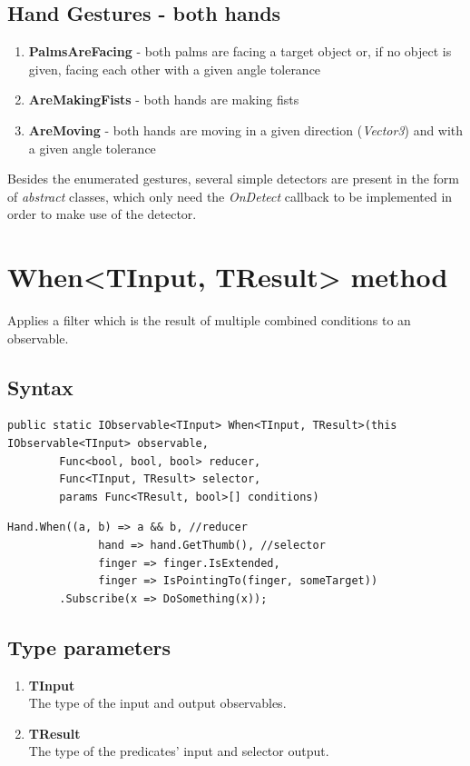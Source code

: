 \documentclass[12pt,a4paper,twoside]{report}
\begin{document}
\subsection{Hand Gestures - both hands}
\begin{enumerate}
  \item \textbf{PalmsAreFacing} - both palms are facing a target object or, if no object is given, facing each other with a given angle tolerance
  \item \textbf{AreMakingFists} - both hands are making fists
  \item \textbf{AreMoving} - both hands are moving in a given direction (\textit{Vector3}) and with a given angle tolerance
\end{enumerate}

Besides the enumerated gestures, several simple detectors are present in the form of \textit{abstract} classes, which only need the \textit{OnDetect} callback to be implemented in order to make use of the detector.

\section{When<TInput, TResult> method}

Applies a filter which is the result of multiple combined conditions to an observable.

\subsection{Syntax}

\begin{lstlisting}[caption=Declaration]
    public static IObservable<TInput> When<TInput, TResult>(this IObservable<TInput> observable,
        Func<bool, bool, bool> reducer,
        Func<TInput, TResult> selector,
        params Func<TResult, bool>[] conditions) 
\end{lstlisting}

\begin{lstlisting}[caption=Usage example]
    Hand.When((a, b) => a && b, //reducer
              hand => hand.GetThumb(), //selector
              finger => finger.IsExtended,
              finger => IsPointingTo(finger, someTarget))
        .Subscribe(x => DoSomething(x));
\end{lstlisting}

\subsection{Type parameters}
\begin{enumerate}
    \item \textbf{TInput} \\
        The type of the input and output observables.
    \item \textbf{TResult} \\
        The type of the predicates' input and selector output. 
\end{enumerate}
\end{document}
